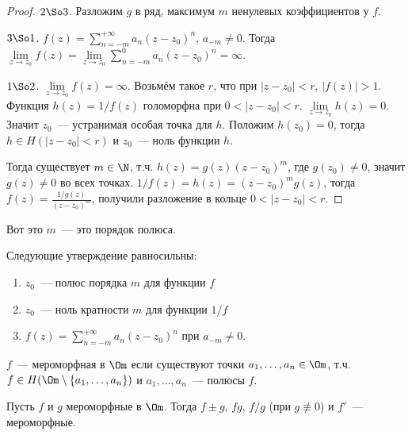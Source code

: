 \begin{proof}
    $2 \So 3$. Разложим $g$ в ряд, максимум $m$ ненулевых
    коэффициентов у $f$.

    $3 \So 1$.
    $f(z) = \sum\limits_{n=-m}^{+\infty} a_n(z-z_0)^n$,
    $a_{-m} \ne 0$. Тогда
    $\lim\limits_{z \to z_0} f(z) = \lim\limits_{z \to z_0} \sum\limits_{n=-m}^{0} a_n(z-z_0)^n
        = \infty$.

    $1 \So 2$. $\lim\limits_{z \to z_0} f(z) = \infty$.
    Возьмём такое $r$, что при $|z-z_0| < r$, $|f(z)| > 1$.
    Функция $h(z) = 1/f(z)$ голоморфна при $0 < |z-z_0| < r$.
    $\lim\limits_{z\to z_0} h(z) = 0$. Значит $z_0$~--- устранимая
    особая точка для $h$. Положим $h(z_0) = 0$, тогда
    $h \in H(|z-z_0| < r)$ и $z_0$~--- ноль функции $h$.

    Тогда существует $m \in \N$, т.ч. $h(z) = g(z)(z-z_0)^m$,
    где $g(z_0) \ne 0$, значит $g(z) \ne 0$ во всех точках.
    $1/f(z) = h(z) = (z-z_0)^m g(z)$,
    тогда $f(z) = \frac{1/g(z)}{(z-z_0)^m}$, получили разложение
    в кольце $0 < |z-z_0| < r$.
\end{proof}

\begin{definition}
    Вот это $m$~--- это порядок полюса.
\end{definition}

\begin{observation}
    Следующие утверждение равносильны:

    \begin{enumerate}
        \item $z_0$~--- полюс порядка $m$ для функции $f$
        \item $z_0$~--- ноль кратности $m$ для функции $1/f$
        \item $f(z) = \sum\limits_{n=-m}^{+\infty} a_n(z-z_0)^n$ при $a_{-m} \ne 0$.
    \end{enumerate}
\end{observation}

\begin{definition}
    $f$~--- мероморфная в $\Om$ если
    существуют точки $a_1, \ldots, a_n \in \Om$,
    т.ч. $f \in H(\Om \setminus \left\{a_1, \ldots, a_n\right\})$
    и $a_1, \ldots, a_n$~--- полюсы $f$.
\end{definition}

\begin{properties}
    Пусть $f$ и $g$ мероморфные в $\Om$.
    Тогда $f \pm g$, $fg$, $f/g$ (при $g \not\equiv 0$)
    и $f'$~--- мероморфные.
\end{properties}

